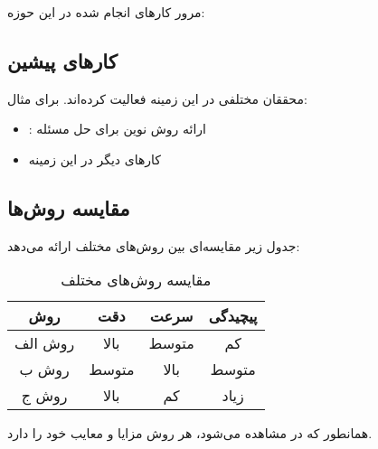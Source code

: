 مرور کارهای انجام شده در این حوزه:

\subsection{کارهای پیشین}
محققان مختلفی در این زمینه فعالیت کرده‌اند. برای مثال:

\begin{itemize}
    \item \cite{sample-reference}: ارائه روش نوین برای حل مسئله
    \item کارهای دیگر در این زمینه
\end{itemize}

\subsection{مقایسه روش‌ها}
جدول زیر مقایسه‌ای بین روش‌های مختلف ارائه می‌دهد:

\begin{table}[h]
\centering
\caption{مقایسه روش‌های مختلف}
\label{tab:comparison}
\begin{tabular}{|c|c|c|c|}
\hline
\textbf{روش} & \textbf{دقت} & \textbf{سرعت} & \textbf{پیچیدگی} \\
\hline
روش الف & بالا & متوسط & کم \\
\hline
روش ب & متوسط & بالا & متوسط \\
\hline
روش ج & بالا & کم & زیاد \\
\hline
\end{tabular}
\end{table}

همانطور که در  مشاهده می‌شود، هر روش مزایا و معایب خود را دارد.

